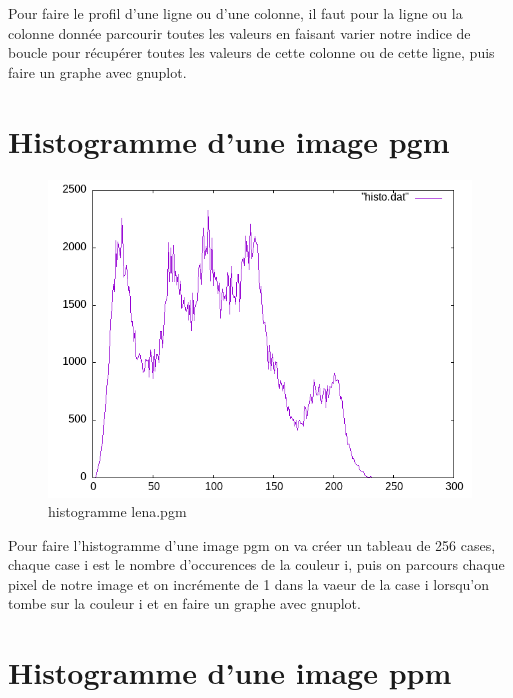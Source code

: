 \documentclass{article}
\begin{document}
Pour faire le profil d'une ligne ou d'une colonne, il faut pour la ligne ou la colonne donnée parcourir toutes les valeurs en faisant varier notre indice de boucle pour récupérer toutes les valeurs de cette colonne ou de cette ligne, puis faire un graphe avec gnuplot.

\section{Histogramme d'une image pgm}

\begin{figure}[h]
\centerline{\includegraphics[scale=0.5]{./rendus/histopgmlena.png}}
\caption{histogramme lena.pgm}
\end{figure}

Pour faire l'histogramme d'une image pgm on va créer un tableau de 256 cases, chaque case i est le nombre d'occurences de la couleur i, puis on parcours chaque pixel de notre image et on incrémente de 1 dans la vaeur de la case i lorsqu'on tombe sur la couleur i et en faire un graphe avec gnuplot.

\section{Histogramme d'une image ppm}
\end{document}

